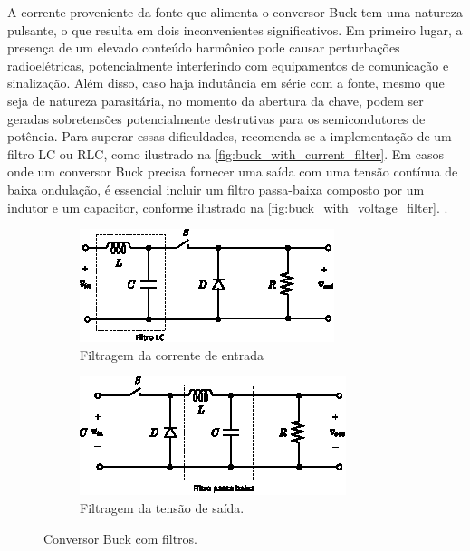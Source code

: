 A corrente proveniente da fonte que alimenta o conversor Buck tem uma natureza pulsante, o que resulta em dois inconvenientes significativos. Em primeiro lugar, a presença de um elevado conteúdo harmônico pode causar perturbações radioelétricas, potencialmente interferindo com equipamentos de comunicação e sinalização. Além disso, caso haja indutância em série com a fonte, mesmo que seja de natureza parasitária, no momento da abertura da chave, podem ser geradas sobretensões potencialmente destrutivas para os semicondutores de potência. Para superar essas dificuldades, recomenda-se a implementação de um filtro LC ou RLC, como ilustrado na \autoref{fig:buck_with_current_filter}. Em casos onde um conversor Buck precisa fornecer uma saída com uma tensão contínua de baixa ondulação, é essencial incluir um filtro passa-baixa composto por um indutor e um capacitor, conforme ilustrado na \autoref{fig:buck_with_voltage_filter}. \cite{martins2008}.

\begin{figure}[H]
  \captionsetup{justification=centering}
  \centering
  \begin{subfigure}[t]{0.45\textwidth}
    \centering
    \includegraphics[width=\textwidth]{figuras/buck_with_current_filter.eps}
    \caption{Filtragem da corrente de entrada}
    \label{fig:buck_with_current_filter}
  \end{subfigure}
  \hfil
  \begin{subfigure}[t]{0.45\textwidth}
    \centering
    \includegraphics[width=\textwidth]{figuras/buck_with_voltage_filter.eps}
    \caption{Filtragem da tensão de saída.}
    \label{fig:buck_with_voltage_filter}
  \end{subfigure}
  \caption{Conversor Buck com filtros.}
\end{figure}

